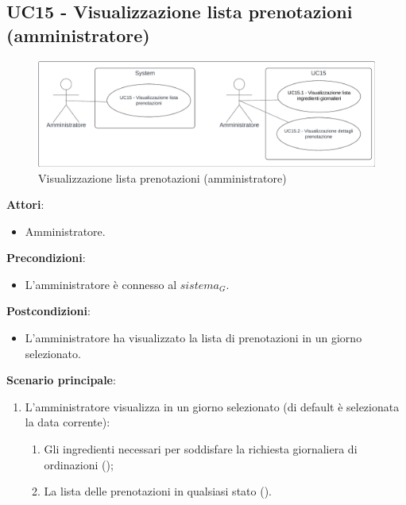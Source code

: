 \subsection{UC15 - Visualizzazione lista prenotazioni (amministratore)} \label{usecase:15}
\begin{figure}[H]
    \centering
    \includegraphics[width=0.9\linewidth]{ucd/ucd15.png}
    \caption{Visualizzazione lista prenotazioni (amministratore)}
\end{figure}
\textbf{Attori}:
\begin{itemize}
    \item Amministratore.
\end{itemize}
\textbf{Precondizioni}:
\begin{itemize}
    \item L'amministratore è connesso al $\textit{sistema}_G$.
\end{itemize}
\textbf{Postcondizioni}:
\begin{itemize}
    \item L'amministratore ha visualizzato la lista di prenotazioni in un giorno selezionato.
\end{itemize}
\textbf{Scenario principale}:
\begin{enumerate}
   \item L'amministratore visualizza in un giorno selezionato (di default è selezionata la data corrente):
   \begin{enumerate}
       \item Gli ingredienti necessari per soddisfare la richiesta giornaliera di ordinazioni ();
       \item La lista delle prenotazioni in qualsiasi stato
       ().
   \end{enumerate}
\end{enumerate}

